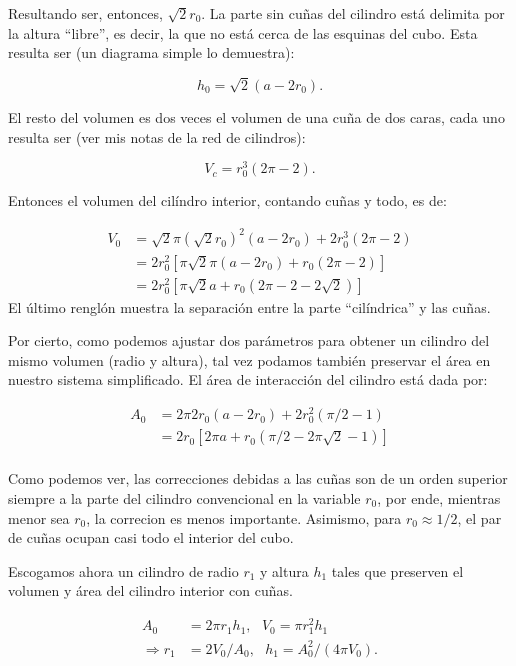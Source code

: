 \documentclass[letterpaperr,12pt]{article}
\begin{document}
Resultando ser, entonces, $\sqrt{2} r_0$.
La parte sin cuñas del cilindro está delimita por la altura
``libre'', es decir, la que no está cerca de las esquinas del cubo. 
Esta resulta ser (un diagrama simple lo demuestra):

\begin{equation}
h_0=\sqrt{2} (a-2 r_0).
\end{equation} 

El resto del volumen es dos veces el volumen de una cuña de dos caras,
cada uno resulta ser (ver mis notas de la red de cilindros):

\begin{equation}
V_c=r_0^3 (2\pi-2).
\end{equation}

Entonces el volumen del cilíndro interior, contando cuñas y todo, es de:

\begin{align}
V_0 &= \sqrt{2} \pi (\sqrt{2} r_0)^2 (a-2 r_0)+ 2r_0^3 (2\pi-2)\\
&= 2  r_0^2 [\pi \sqrt{2} \pi (a - 2 r_0) + r_0 (2\pi-2) ] \\
&= 2  r_0^2 [ \pi \sqrt{2} a  + r_0 (2\pi-2-2 \sqrt{2}) ] 
\end{align}
El último renglón muestra la separación entre la parte
``cilíndrica'' y las cuñas.

Por cierto, como podemos ajustar dos parámetros para obtener
un cilindro del mismo volumen (radio y altura), tal vez podamos
también preservar el área en nuestro sistema simplificado.
El área de interacción del cilindro está dada por:

\begin{align}
A_0 &= 2\pi 2 r_0 (a-2 r_0)+ 2 r_0^2(\pi/2-1)\\
&= 2 r_0 [2\pi a +  r_0 (\pi/2-2\pi\sqrt{2}-1)]\\
\end{align}

Como podemos ver, las correcciones debidas a las cuñas son
de un orden superior siempre a la parte del cilindro convencional en
la variable $r_0$, por ende, mientras menor sea $r_0$, la correcion 
es menos importante. Asimismo, para $r_0 \approx 1/2$, el par de cuñas ocupan
casi todo el interior del cubo. 

Escogamos ahora un cilindro de radio $r_1$ y altura $h_1$ tales
que preserven el volumen y área del cilindro interior con cuñas.

\begin{align}
A_0 & = 2\pi r_1 h_1, \text{ } V_0 = \pi r_1^2 h_1 \\
\Rightarrow r_1 & = 2V_0/A_0, \text{ }h_1  =  A_0^2/(4 \pi V_0 ).  
\end{align}
\end{document}
